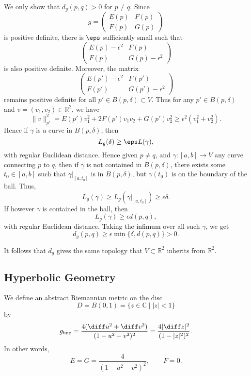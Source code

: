 \documentclass[12pt]{article}
\begin{document}
\begin{proofbox}
	We only show that $d_g(p, q) > 0$ for $p \neq q$. Since
	\[
	g =
	\begin{pmatrix}
		E(p) & F(p) \\ F(p) & G(p)
	\end{pmatrix}
	\]
	is positive definite, there is $\eps$ sufficiently small such that
	\[
	\begin{pmatrix}
		E(p) - \epsilon^2 & F(p) \\ F(p) & G(p) - \epsilon^2
	\end{pmatrix}
	\]
	is also positive definite. Moreover, the matrix
	\[
	\begin{pmatrix}
		E(p') - \epsilon^2 & F(p') \\ F(p') & G(p') - \epsilon^2
	\end{pmatrix}
	\]
	remains positive definite for all $p' \in B(p, \delta) \subset V$. Thus for any $p' \in B(p, \delta)$ and $v = (v_1, v_2) \in \mathbb{R}^2$, we have
	\[
	\|v\|_{p'}^2 = E(p')v_1^2 + 2F(p')v_1v_2 + G(p')v_2^2 \geq \epsilon^2 (v_1^2 + v_2^2).
	\]
	Hence if $\gamma$ is a curve in $B(p,\delta)$, then
	\[
	L_g(\delta) \geq \eps L(\gamma),
	\]
	with regular Euclidean distance. Hence given $p \neq q$, and $\gamma : [a, b] \to V$ any curve connecting $p$ to $q$, then if $\gamma$ is not contained in $B(p, \delta)$, there exists some $t_0 \in [a, b]$ such that $\gamma|_{[a, t_0]}$ is in $B(p, \delta)$, but $\gamma(t_0)$ is on the boundary of the ball. Thus,
	\[
		L_{g}(\gamma) \geq L_{g}(\gamma|_{[a, t_0]}) \geq \epsilon \delta.
	\]
	If however $\gamma$ is contained in the ball, then
	\[
	L_g(\gamma) \geq \epsilon d(p, q),
	\]
	with regular Euclidean distance. Taking the infimum over all such $\gamma$, we get
	\[
		d_g(p, q) \geq \epsilon \min\{\delta, d(p, q)\} > 0.
	\]
\end{proofbox}

\begin{remark}
	It follows that $d_g$ gives the same topology that $V \subset \mathbb{R}^2$ inherits from $\mathbb{R}^2$.
\end{remark}

\subsection{Hyperbolic Geometry}
\label{sub:hyperbolic_geometry}

\begin{definition}
	We define an abstract Riemannian metric on the disc
	\[
		D = B(0, 1) = \{z \in \mathbb{C} \mid |z| < 1\}
	\]
	by
	\[
		g_{\mathrm{hyp}} = \frac{4 (\diff u^2 + \diff v^2)}{(1 - u^2 - v^2)^2} = \frac{4 |\diff z|^2}{(1 - |z|^2)^2}.
	\]
	In other words,
	\[
	E = G = \frac{4}{(1 - u^2 - v^2)^2}, \qquad F = 0.
	\]
\end{definition}
\end{document}
